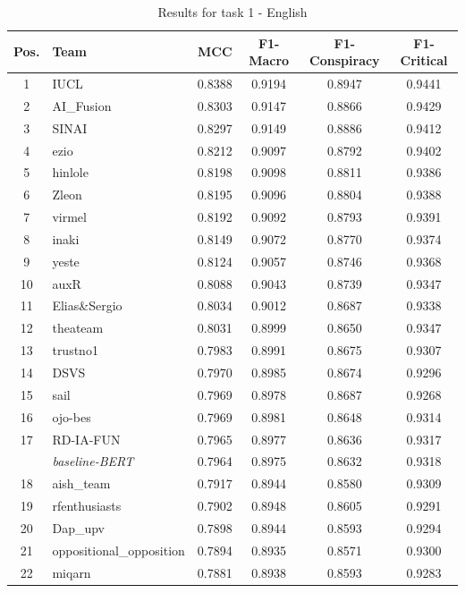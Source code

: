 \documentclass{Configuration_Files/PoliMi3i_thesis}
\begin{document}
\begin{table}[H]
\centering
\small
\renewcommand{\arraystretch}{0.8} %
\begin{tabular}{clcccc}
\hline
\textbf{Pos.} & \textbf{Team} & \textbf{MCC} & \textbf{F1-Macro} & \textbf{F1-Conspiracy} & \textbf{F1-Critical} \\ \hline
1 & IUCL & 0.8388 & 0.9194 & 0.8947 & 0.9441 \\
2 & AI\_Fusion & 0.8303 & 0.9147 & 0.8866 & 0.9429 \\
3 & SINAI & 0.8297 & 0.9149 & 0.8886 & 0.9412 \\
4 & ezio & 0.8212 & 0.9097 & 0.8792 & 0.9402 \\
5 & hinlole & 0.8198 & 0.9098 & 0.8811 & 0.9386 \\
6 & Zleon & 0.8195 & 0.9096 & 0.8804 & 0.9388 \\
7 & virmel & 0.8192 & 0.9092 & 0.8793 & 0.9391 \\
8 & inaki & 0.8149 & 0.9072 & 0.8770 & 0.9374 \\
9 & yeste & 0.8124 & 0.9057 & 0.8746 & 0.9368 \\
10 & auxR & 0.8088 & 0.9043 & 0.8739 & 0.9347 \\
11 & Elias\&Sergio & 0.8034 & 0.9012 & 0.8687 & 0.9338 \\
12 & theateam & 0.8031 & 0.8999 & 0.8650 & 0.9347 \\
13 & trustno1 & 0.7983 & 0.8991 & 0.8675 & 0.9307 \\
14 & DSVS & 0.7970 & 0.8985 & 0.8674 & 0.9296 \\
15 & sail & 0.7969 & 0.8978 & 0.8687 & 0.9268 \\
16 & ojo-bes & 0.7969 & 0.8981 & 0.8648 & 0.9314 \\
17 & RD-IA-FUN & 0.7965 & 0.8977 & 0.8636 & 0.9317 \\
& \textit{baseline-BERT} & 0.7964 & 0.8975 & 0.8632 & 0.9318 \\
18 & aish\_team & 0.7917 & 0.8944 & 0.8580 & 0.9309 \\
19 & rfenthusiasts & 0.7902 & 0.8948 & 0.8605 & 0.9291 \\
20 & Dap\_upv & 0.7898 & 0.8944 & 0.8593 & 0.9294 \\
21 & oppositional\_opposition & 0.7894 & 0.8935 & 0.8571 & 0.9300 \\
22 & miqarn & 0.7881 & 0.8938 & 0.8593 & 0.9283 \\
\hline
\end{tabular}
\caption{\small Results for task 1 - English \cite{korencic2024oppositional}}
\label{tab:task1_results_en_full}
\end{table}
\FloatBarrier
\end{document}
